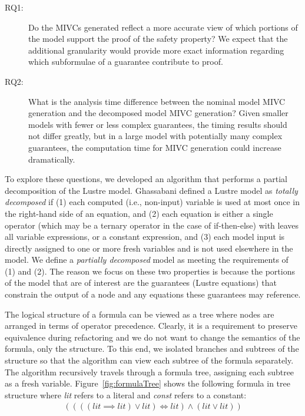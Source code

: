 \begin{description}
\item[RQ1:] Do the MIVCs generated reflect a more accurate view of which portions of the model support the proof of the safety property? We expect that the additional granularity would provide more exact information regarding which subformulae of a guarantee contribute to proof.

\item [RQ2:] What is the analysis time difference between the nominal model MIVC generation and the decomposed model MIVC generation? Given smaller models with fewer or less complex guarantees, the timing results should not differ greatly, but in a large model with potentially many complex guarantees, the computation time for MIVC generation could increase dramatically. 
 
\end{description}

To explore these questions, we developed an algorithm that performs a partial decomposition of the Lustre model. Ghassabani defined a Lustre model as {\em totally decomposed} if (1) each computed (i.e., non-input) variable is used at most once in the right-hand side of an equation, and (2) each equation is either a single operator (which may be a ternary operator in the case of if-then-else) with leaves all variable expressions, or a constant expression, and (3) each model input is directly assigned to one or more fresh variables and is not used elsewhere in the model. We define a {\em partially decomposed} model as meeting the requirements of (1) and (2). The reason we focus on these two properties is because the portions of the model that are of interest are the guarantees (Lustre equations) that constrain the output of a node and any equations these guarantees may reference. 

The logical structure of a formula can be viewed as a tree where nodes are arranged in terms of operator precedence. Clearly, it is a requirement to preserve equivalence during refactoring and we do not want to change the semantics of the formula, only the structure. To this end, we isolated branches and subtrees of the structure so that the \aivcalg algorithm can view each subtree of the formula separately. The algorithm recursively travels through a formula tree, assigning each subtree as a fresh variable. Figure~\ref{fig:formulaTree} shows the following formula in tree structure where \textit{lit} refers to a literal and \textit{const} refers to a constant:
\begin{gather*}
((((\mathit{lit} \implies \mathit{lit}) \lor \mathit{lit}) \iff \mathit{lit} ) \land (\mathit{lit}  \lor \mathit{lit} )) 
\end{gather*} 

